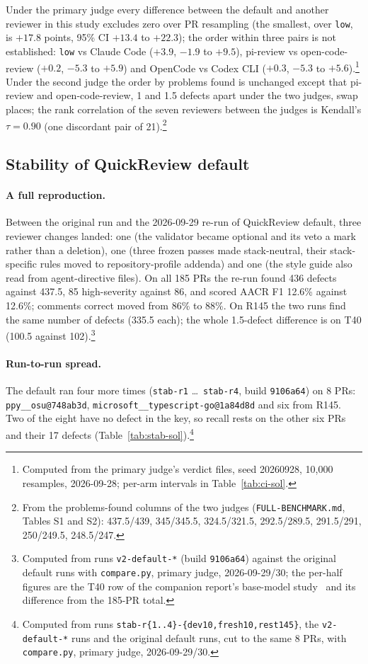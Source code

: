 \documentclass[11pt,a4paper]{article}
\newcommand{\qcr}{QuickReview}
\newcommand{\code}[1]{\texttt{#1}}
\begin{document}
Under the primary judge every difference between the default and another
reviewer in this study excludes zero over PR resampling (the smallest, over
\code{low}, is $+17.8$ points, 95\% CI $+13.4$ to $+22.3$); the order within
three pairs is not established: \code{low} vs Claude Code ($+3.9$, $-1.9$ to
$+9.5$), pi-review vs open-code-review ($+0.2$, $-5.3$ to $+5.9$) and OpenCode
vs Codex CLI ($+0.3$, $-5.3$ to $+5.6$).\footnote{Computed from the primary
judge's verdict files, seed 20260928, 10{,}000 resamples, 2026-09-28; per-arm
intervals in Table~\ref{tab:ci-sol}.} Under the second judge the order by
problems found is unchanged except that pi-review and open-code-review, 1 and
1.5 defects apart under the two judges, swap places; the rank correlation of
the seven reviewers between the judges is Kendall's $\tau = 0.90$ (one
discordant pair of 21).\footnote{From the problems-found columns of the two
judges (\code{FULL-BENCHMARK.md}, Tables S1 and S2): 437.5/439, 345/345.5,
324.5/321.5, 292.5/289.5, 291.5/291, 250/249.5, 248.5/247.}

\subsection{Stability of \qcr{} default}
\label{sec:stability}

\paragraph{A full reproduction.} Between the original run and the 2026-09-29
re-run of \qcr{} default, three reviewer changes landed: one (the
validator became optional and its veto a mark rather than a deletion),
one (three frozen passes made stack-neutral, their stack-specific rules
moved to repository-profile addenda) and one (the style guide also read
from agent-directive files). On all 185 PRs the re-run found 436 defects
against 437.5, 85 high-severity against 86, and scored AACR F1 12.6\% against
12.6\%; comments correct moved from 86\% to 88\%. On R145 the two runs find
the same number of defects (335.5 each); the whole 1.5-defect difference is
on T40 (100.5 against 102).\footnote{Computed from runs \code{v2-default-*}
(build \code{9106a64}) against the original default runs with
\code{compare.py}, primary judge, 2026-09-29/30; the per-half figures are the
T40 row of the companion report's base-model study~\cite{qcrreport} and its
difference from the 185-PR total.}

\paragraph{Run-to-run spread.} The default ran four more times
(\code{stab-r1} \ldots\ \code{stab-r4}, build \code{9106a64}) on 8 PRs:
\code{ppy\_\_osu@748ab3d}, \code{microsoft\_\_typescript-go@1a84d8d} and six
from R145. Two of the eight have no defect in the key, so recall rests on the
other six PRs and their 17 defects (Table~\ref{tab:stab-sol}).\footnote{Computed
from runs \code{stab-r\{1..4\}-\{dev10,fresh10,rest145\}}, the
\code{v2-default-*} runs and the original default runs, cut to the same 8
PRs, with \code{compare.py}, primary judge, 2026-09-29/30.}
\end{document}

